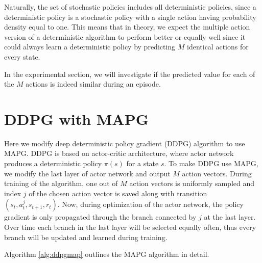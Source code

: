 Naturally, the set of stochastic policies includes all deterministic policies, since a deterministic policy is a stochastic policy with a single action having probability density equal to one. This means that in theory, we expect the multiple action version of a deterministic algorithm to perform better or equally well since it could always learn a deterministic policy by predicting $M$ identical actions for every state.

In the experimental section, we will investigate if the predicted value for each of the $M$ actions is indeed similar during an episode. 

\newpage
\section{DDPG with MAPG}
Here we modify deep deterministic policy gradient (DDPG) algorithm to use MAPG. DDPG is based on actor-critic architecture, where actor network produces a deterministic policy $\pi(s)$ for a state $s$. To make DDPG use MAPG, we modify the last layer of actor network and output $M$ action vectors. During training of the algorithm, one out of $M$ action vectors is uniformly sampled and index $j$ of the chosen action vector is saved along with transition $(s_t, a^j_t, s_{t+1}, r_t) $. Now, during optimization of the actor network, the policy gradient is only propagated through the branch connected by $j$ at the last layer. Over time each branch in the last layer will be selected equally often, thus every branch will be updated and learned during training. 


Algorithm \ref{alg:ddpgmap} outlines the MAPG algorithm in detail. 


\newpage

